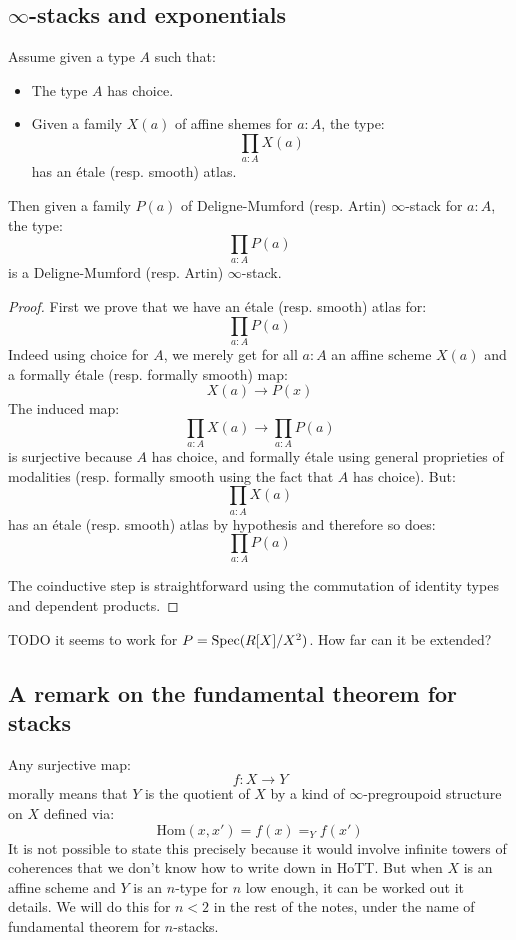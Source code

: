 \subsection{$\infty$-stacks and exponentials}

\begin{lemma}
Assume given a type $A$ such that:
\begin{itemize}
\item The type $A$ has choice.
\item Given a family $X(a)$ of affine shemes for $a:A$, the type:
\[\prod_{a:A}X(a)\] 
has an étale (resp. smooth) atlas.
\end{itemize}
Then given a family $P(a)$ of Deligne-Mumford (resp. Artin) $\infty$-stack for $a:A$, the type:
\[\prod_{a:A}P(a)\]
is a Deligne-Mumford (resp. Artin) $\infty$-stack.
\end{lemma}

\begin{proof}
First we prove that we have an étale (resp. smooth) atlas for:
\[\prod_{a:A}P(a)\]
Indeed using choice for $A$, we merely get for all $a:A$ an affine scheme $X(a)$ and a formally étale (resp. formally smooth) map:
\[X(a)\to P(x)\]
The induced map:
\[\prod_{a:A}X(a) \to \prod_{a:A}P(a)\] 
is surjective because $A$ has choice, and formally étale using general proprieties of modalities (resp. formally smooth using the fact that $A$ has choice). But:
\[\prod_{a:A}X(a)\]
has an étale (resp. smooth) atlas by hypothesis and therefore so does:
\[\prod_{a:A}P(a)\]

The coinductive step is straightforward using the commutation of identity types and dependent products.
\end{proof}

TODO it seems to work for $P = \operatorname{Spec}(R[X]/X^2)$. How far can it be extended?

\subsection{A remark on the fundamental theorem for stacks}

Any surjective map:
\[f:X\to Y\]
morally means that $Y$ is the quotient of $X$ by a kind of $\infty$-pregroupoid structure on $X$ defined via:
\[\mathrm{Hom}(x,x') = f(x)=_Yf(x')\]
It is not possible to state this precisely because it would involve infinite towers of coherences that we don't know how to write down in HoTT. But when $X$ is an affine scheme and $Y$ is an $n$-type for $n$ low enough, it can be worked out it details. We will do this for $n<2$ in the rest of the notes, under the name of fundamental theorem for $n$-stacks.

